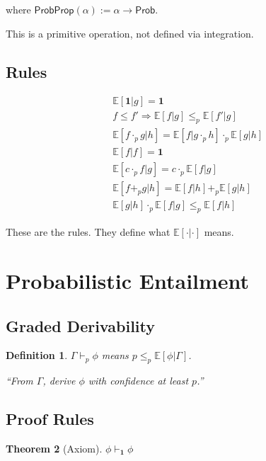\documentclass[11pt,a4paper]{article}
\newtheorem{theorem}{Theorem}[section]
\newtheorem{definition}[theorem]{Definition}
\newcommand{\Prob}{\mathsf{Prob}}
\newcommand{\ProbProp}{\mathsf{ProbProp}}
\newcommand{\E}{\mathbb{E}}
\newcommand{\pone}{\mathbf{1}}
\newcommand{\ple}{\leq_p}
\newcommand{\padd}{+_p}
\newcommand{\pmul}{\cdot_p}
\begin{document}
where $\ProbProp(\alpha) := \alpha \to \Prob$.

This is a primitive operation, not defined via integration.

\subsection{Rules}

\begin{align}
&\E[\mathbf{1} | g] = \pone \tag{norm} \\
&f \le f' \Rightarrow \E[f|g] \ple \E[f'|g] \tag{mono} \\
&\E[f \pmul g | h] = \E[f | g \pmul h] \pmul \E[g | h] \tag{product} \\
&\E[f | f] = \pone \tag{self} \\
&\E[c \pmul f | g] = c \pmul \E[f | g] \tag{const} \\
&\E[f \padd g | h] = \E[f|h] \padd \E[g|h] \tag{add} \\
&\E[g|h] \pmul \E[f|g] \ple \E[f|h] \tag{chain}
\end{align}

These are the rules. They define what $\E[\cdot|\cdot]$ means.

\section{Probabilistic Entailment}

\subsection{Graded Derivability}

\begin{definition}
$\Gamma \vdash_p \phi$ means $p \ple \E[\phi | \Gamma]$.

``From $\Gamma$, derive $\phi$ with confidence at least $p$.''
\end{definition}

\subsection{Proof Rules}

\begin{theorem}[Axiom]
$\phi \vdash_{\pone} \phi$
\end{theorem}
\end{document}
